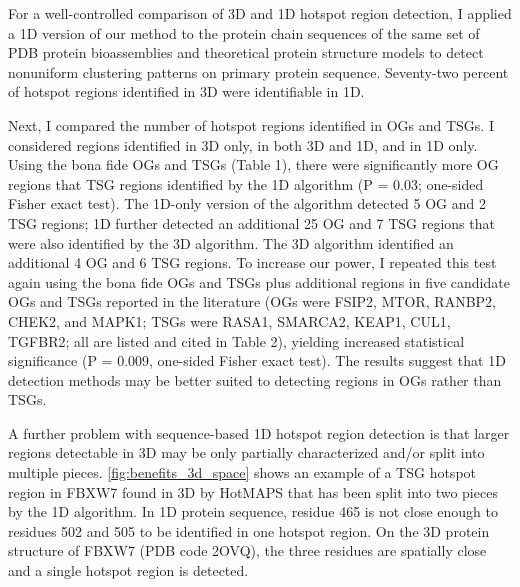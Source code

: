 For a well-controlled comparison of 3D and 1D hotspot region detection, I applied a 1D version of our method to the protein chain sequences of the same set of PDB protein bioassemblies and theoretical protein structure models to detect nonuniform clustering patterns on primary protein sequence. Seventy-two percent of hotspot regions identified in 3D were identifiable in 1D.

Next, I compared the number of hotspot regions identified in OGs and TSGs. I considered regions identified in 3D only, in both 3D and 1D, and in 1D only. Using the bona fide OGs and TSGs (Table 1), there were significantly more OG regions that TSG regions identified by the 1D algorithm (P = 0.03; one-sided Fisher exact test). The 1D-only version of the algorithm detected 5 OG and 2 TSG regions; 1D further detected an additional 25 OG and 7 TSG regions that were also identified by the 3D algorithm. The 3D algorithm identified an additional 4 OG and 6 TSG regions. To increase our power, I repeated this test again using the bona fide OGs and TSGs plus additional regions in five candidate OGs and TSGs reported in the literature (OGs were FSIP2, MTOR, RANBP2, CHEK2, and MAPK1; TSGs were RASA1, SMARCA2, KEAP1, CUL1, TGFBR2; all are listed and cited in Table 2), yielding increased statistical significance (P = 0.009, one-sided Fisher exact test). The results suggest that 1D detection methods may be better suited to detecting regions in OGs rather than TSGs.

A further problem with sequence-based 1D hotspot region detection is that larger regions detectable in 3D may be only partially characterized and/or split into multiple pieces. \autoref{fig:benefits_3d_space} shows an example of a TSG hotspot region in FBXW7 found in 3D by HotMAPS that has been split into two pieces by the 1D algorithm. In 1D protein sequence, residue 465 is not close enough to residues 502 and 505 to be identified in one hotspot region. On the 3D protein structure of FBXW7 (PDB code 2OVQ), the three residues are spatially close and a single hotspot region is detected.

